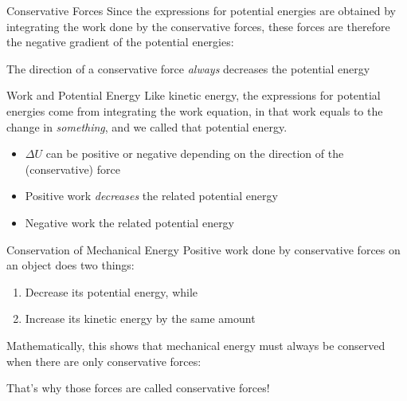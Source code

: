 \documentclass[12pt,compress,aspectratio=169]{beamer}
\newcommand{\mb}[1]{\ensuremath\mathbf{#1}}
\newcommand{\eq}[2]{\vspace{#1}{\Large\begin{displaymath}#2\end{displaymath}}}
\begin{document}
\begin{frame}{Conservative Forces}
  Since the expressions for potential energies are obtained by integrating the
  work done by the conservative forces, these forces are therefore the
  negative gradient of the potential energies:

  \eq{-.2in}{
    \boxed{\mb{F}=-\nabla U=
      -\frac{\partial U}{\partial x}\bm{\hat{\imath}}
      -\frac{\partial U}{\partial y}\bm{\hat{\jmath}}
      -\frac{\partial U}{\partial z}\hat{\bm{k}}
    }
  }

  The direction of a conservative force \emph{always} decreases the potential
  energy
\end{frame}




\begin{frame}{Work and Potential Energy}
  Like kinetic energy, the expressions for potential energies come from
  integrating the work equation, in that work equals to the change in
  \emph{something}, and we called that potential energy.

  \eq{-.3in}{
    \boxed{W=-\Delta U}
  }
  \begin{itemize}
  \item\vspace{-.15in}$\Delta U$ can be positive or negative depending on the
    direction of the (conservative) force
  \item Positive work \emph{decreases} the related potential energy
  \item Negative work  the related potential energy
  \end{itemize}
\end{frame}



\begin{frame}{Conservation of Mechanical Energy}
  Positive work done by conservative forces on an object does two things:
  \begin{enumerate}[1.]
  \item Decrease its potential energy, while
  \item Increase its kinetic energy by the same amount
  \end{enumerate}
  Mathematically, this shows that mechanical energy must always be conserved
  when there are only conservative forces:

  \eq{-.15in}{
    W=-\Delta U = \Delta K \quad\longrightarrow\quad
    \boxed{\Delta K + \Delta U =0}
  }

  That's why those forces are called conservative forces!
\end{frame}
\end{document}
